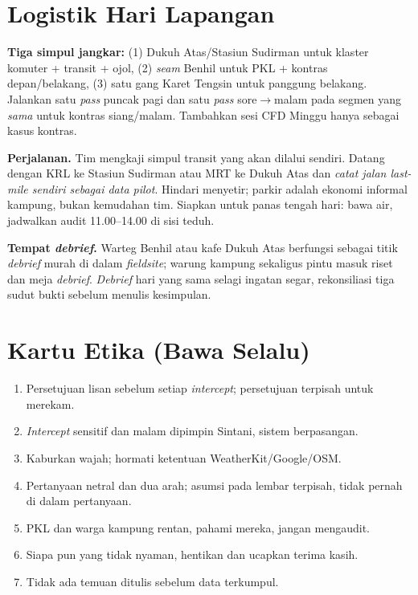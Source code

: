 \documentclass[11pt,a4paper]{report}
\begin{document}
\section{Logistik Hari Lapangan}
\textbf{Tiga simpul jangkar:} (1) Dukuh Atas/Stasiun Sudirman untuk klaster komuter +
transit + ojol, (2) \emph{seam} Benhil untuk PKL + kontras depan/belakang, (3) satu gang
Karet Tengsin untuk panggung belakang. Jalankan satu \emph{pass} puncak pagi dan satu
\emph{pass} sore$\rightarrow$malam pada segmen yang \emph{sama} untuk kontras siang/malam.
Tambahkan sesi CFD Minggu hanya sebagai kasus kontras.

\smallskip\noindent\textbf{Perjalanan.} Tim mengkaji simpul transit yang akan dilalui
sendiri. Datang dengan KRL ke Stasiun Sudirman atau MRT ke Dukuh Atas dan \emph{catat
jalan \emph{last-mile} sendiri sebagai data pilot}. Hindari menyetir; parkir adalah ekonomi
informal kampung, bukan kemudahan tim. Siapkan untuk panas tengah hari: bawa air, jadwalkan
audit 11.00--14.00 di sisi teduh.

\smallskip\noindent\textbf{Tempat \emph{debrief}.} Warteg Benhil atau kafe Dukuh Atas
berfungsi sebagai titik \emph{debrief} murah di dalam \emph{fieldsite}; warung kampung
sekaligus pintu masuk riset dan meja \emph{debrief}. \emph{Debrief} hari yang sama selagi
ingatan segar, rekonsiliasi tiga sudut bukti sebelum menulis kesimpulan.

\section{Kartu Etika (Bawa Selalu)}
\begin{enumerate}
  \item Persetujuan lisan sebelum setiap \emph{intercept}; persetujuan terpisah untuk merekam.
  \item \emph{Intercept} sensitif dan malam dipimpin Sintani, sistem berpasangan.
  \item Kaburkan wajah; hormati ketentuan WeatherKit/Google/OSM.
  \item Pertanyaan netral dan dua arah; asumsi pada lembar terpisah, tidak pernah di dalam pertanyaan.
  \item PKL dan warga kampung rentan, pahami mereka, jangan mengaudit.
  \item Siapa pun yang tidak nyaman, hentikan dan ucapkan terima kasih.
  \item Tidak ada temuan ditulis sebelum data terkumpul.
\end{enumerate}
\end{document}
